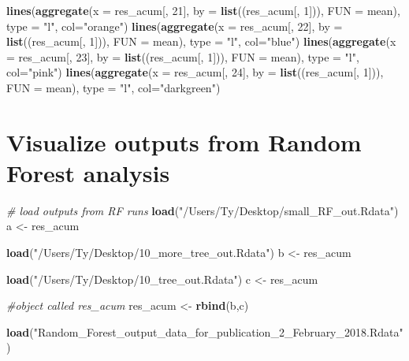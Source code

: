 \documentclass[]{book}
\newenvironment{Shaded}{\begin{snugshade}}{\end{snugshade}}
\newcommand{\KeywordTok}[1]{\textcolor[rgb]{0.13,0.29,0.53}{\textbf{{#1}}}}
\newcommand{\DataTypeTok}[1]{\textcolor[rgb]{0.13,0.29,0.53}{{#1}}}
\newcommand{\DecValTok}[1]{\textcolor[rgb]{0.00,0.00,0.81}{{#1}}}
\newcommand{\StringTok}[1]{\textcolor[rgb]{0.31,0.60,0.02}{{#1}}}
\newcommand{\CommentTok}[1]{\textcolor[rgb]{0.56,0.35,0.01}{\textit{{#1}}}}
\newcommand{\NormalTok}[1]{{#1}}
\theoremstyle{definition}
\theoremstyle{definition}
\theoremstyle{definition}
\theoremstyle{remark}
\begin{document}
\begin{Shaded}
\begin{Highlighting}[]
\KeywordTok{lines}\NormalTok{(}\KeywordTok{aggregate}\NormalTok{(}\DataTypeTok{x =}\NormalTok{ res_acum[, }\DecValTok{21}\NormalTok{], }\DataTypeTok{by =} \KeywordTok{list}\NormalTok{((res_acum[, }\DecValTok{1}\NormalTok{])), }\DataTypeTok{FUN =}\NormalTok{ mean), }\DataTypeTok{type =} \StringTok{"l"}\NormalTok{, }\DataTypeTok{col=}\StringTok{"orange"}\NormalTok{)}
\KeywordTok{lines}\NormalTok{(}\KeywordTok{aggregate}\NormalTok{(}\DataTypeTok{x =}\NormalTok{ res_acum[, }\DecValTok{22}\NormalTok{], }\DataTypeTok{by =} \KeywordTok{list}\NormalTok{((res_acum[, }\DecValTok{1}\NormalTok{])), }\DataTypeTok{FUN =}\NormalTok{ mean), }\DataTypeTok{type =} \StringTok{"l"}\NormalTok{, }\DataTypeTok{col=}\StringTok{"blue"}\NormalTok{)}
\KeywordTok{lines}\NormalTok{(}\KeywordTok{aggregate}\NormalTok{(}\DataTypeTok{x =}\NormalTok{ res_acum[, }\DecValTok{23}\NormalTok{], }\DataTypeTok{by =} \KeywordTok{list}\NormalTok{((res_acum[, }\DecValTok{1}\NormalTok{])), }\DataTypeTok{FUN =}\NormalTok{ mean), }\DataTypeTok{type =} \StringTok{"l"}\NormalTok{, }\DataTypeTok{col=}\StringTok{"pink"}\NormalTok{)}
\KeywordTok{lines}\NormalTok{(}\KeywordTok{aggregate}\NormalTok{(}\DataTypeTok{x =}\NormalTok{ res_acum[, }\DecValTok{24}\NormalTok{], }\DataTypeTok{by =} \KeywordTok{list}\NormalTok{((res_acum[, }\DecValTok{1}\NormalTok{])), }\DataTypeTok{FUN =}\NormalTok{ mean), }\DataTypeTok{type =} \StringTok{"l"}\NormalTok{, }\DataTypeTok{col=}\StringTok{"darkgreen"}\NormalTok{)}
\end{Highlighting}
\end{Shaded}

\section{Visualize outputs from Random Forest
analysis}\label{visualize-outputs-from-random-forest-analysis}

\begin{Shaded}
\begin{Highlighting}[]
\CommentTok{# load outputs from RF runs}
\KeywordTok{load}\NormalTok{(}\StringTok{"/Users/Ty/Desktop/small_RF_out.Rdata"}\NormalTok{)}
\NormalTok{a <-}\StringTok{ }\NormalTok{res_acum}

\KeywordTok{load}\NormalTok{(}\StringTok{"/Users/Ty/Desktop/10_more_tree_out.Rdata"}\NormalTok{)}
\NormalTok{b <-}\StringTok{ }\NormalTok{res_acum}

\KeywordTok{load}\NormalTok{(}\StringTok{"/Users/Ty/Desktop/10_tree_out.Rdata"}\NormalTok{)}
\NormalTok{c <-}\StringTok{ }\NormalTok{res_acum}

\CommentTok{#object called res_acum}
\NormalTok{res_acum <-}\StringTok{ }\KeywordTok{rbind}\NormalTok{(b,c)}

\KeywordTok{load}\NormalTok{(}\StringTok{"Random_Forest_output_data_for_publication_2_February_2018.Rdata"}\NormalTok{)}
\end{Highlighting}
\end{Shaded}
\end{document}
